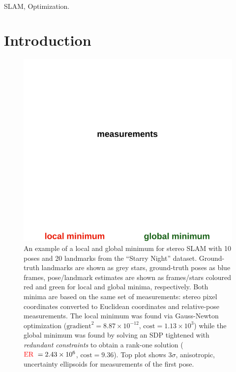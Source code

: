 \documentclass[lettersize,journal]{IEEEtran}
\newcommand{\rev}[1]{\color{red}{#1}\color{black}}
\begin{document}
\begin{IEEEkeywords}
SLAM, Optimization.
\end{IEEEkeywords}

\section{Introduction}
\begin{figure}[!t]
	\centering
	\vspace*{-0.05in}
	\includegraphics[width=\columnwidth]{figs/slam_local_min}
	\vspace*{-0.3in}
	\caption{An example of a local and global minimum for stereo SLAM with 10 poses and 20 landmarks from the ``Starry Night'' dataset. Ground-truth landmarks are shown as grey stars, ground-truth poses as blue frames, pose/landmark estimates are shown as frames/stars coloured red and green for local and global minima, respectively. Both minima are based on the same set of measurements: stereo pixel coordinates converted to Euclidean coordinates and relative-pose measurements. The local minimum was found via Gauss-Newton optimization ($\mbox{gradient}^2=8.87\times10^{-12}$, $\mbox{cost}=1.13\times10^3$) while the global minimum was found by solving an SDP tightened with \emph{redundant constraints} to obtain a rank-one solution ($\mbox{\rev{ER }}=2.43\times10^6$, $\mbox{cost}=9.36$). Top plot shows 3$\sigma$, anisotropic, uncertainty ellipsoids for measurements of the first pose.}
	\vspace*{-0.22in}
	\label{fig:slam_local_min}
\end{figure}
\end{document}
